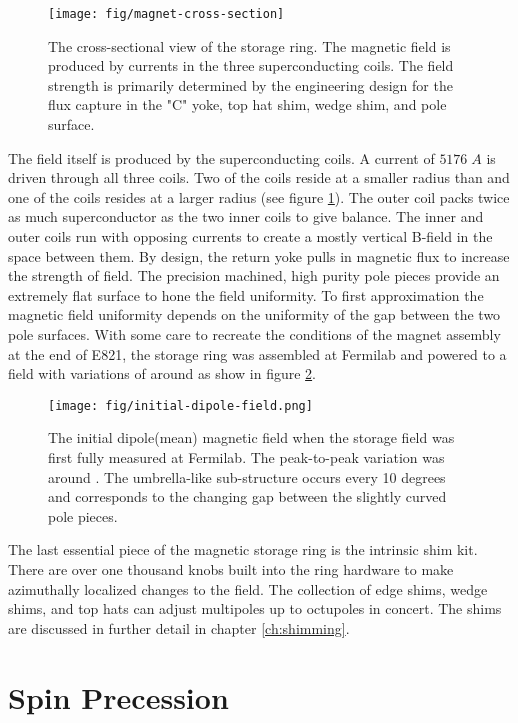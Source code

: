 \begin{figure}
\texttt{[image: fig/magnet-cross-section]}
\caption{The cross-sectional view of the storage ring.  The magnetic field is produced by currents in the three superconducting coils.  The field strength is primarily determined by the engineering design for the flux capture in the "C" yoke, top hat shim, wedge shim, and pole surface.}
\label{fig:magnet-cross-section}
\end{figure}

The field itself is produced by the superconducting coils.  A current of $5176\;A$ is driven through all three coils.  Two of the coils reside at a smaller radius than \rmagic and one of the coils resides at a larger radius (see figure \ref{fig:magnet-cross-section}).  The outer coil packs twice as much superconductor as the two inner coils to give balance.  The inner and outer coils run with opposing currents to create a mostly vertical B-field in the space between them.  By design, the return yoke pulls in magnetic flux to increase the strength of field.  The precision machined, high purity pole pieces provide an extremely flat surface to hone the field uniformity.  To first approximation the magnetic field uniformity depends on the uniformity of the gap between the two pole surfaces.  With some care to recreate the  conditions of the magnet assembly at the end of E821, the storage ring was assembled at Fermilab and powered to a field with variations of around  as show in figure \ref{fig:initial-field}.

\begin{figure}
\texttt{[image: fig/initial-dipole-field.png]}
\caption{The initial dipole(mean) magnetic field when the storage field was first fully measured at Fermilab.  The peak-to-peak variation was around .  The umbrella-like sub-structure occurs every 10 degrees and corresponds to the changing gap between the slightly curved pole pieces.}
\label{fig:initial-field}
\end{figure}

The last essential piece of the magnetic storage ring is the intrinsic shim kit.  There are over one thousand knobs built into the ring hardware to make azimuthally localized changes to the field.  The collection of edge shims, wedge shims, and top hats can adjust multipoles up to octupoles in concert.  The shims are discussed in further detail in chapter \ref{ch:shimming}.

\section{Spin Precession}

